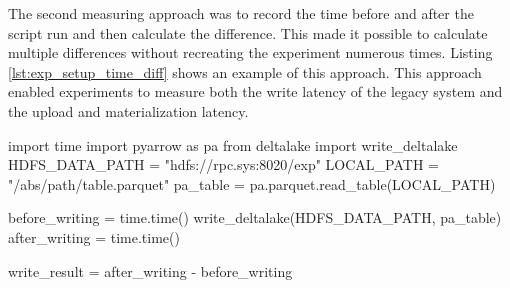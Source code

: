The second measuring approach was to record the time before and after the script run and then calculate the difference. This made it possible to calculate multiple differences without recreating the experiment numerous times. Listing \ref{lst:exp_setup_time_diff} shows an example of this approach. This approach enabled experiments to measure both the write latency of the legacy system and the upload and materialization latency.
\begin{minipage}{\textwidth}
\begin{python}[caption={[Measuring latency using the time difference]A simple time difference approach to measure the time required to write a Delta Lake table to \gls{HopsFS}.}, label={lst:exp_setup_time_diff}]
import time
import pyarrow as pa
from deltalake import write_deltalake
HDFS_DATA_PATH = "hdfs://rpc.sys:8020/exp" 
LOCAL_PATH = "/abs/path/table.parquet"
pa_table = pa.parquet.read_table(LOCAL_PATH)

before_writing = time.time()
write_deltalake(HDFS_DATA_PATH, pa_table)
after_writing = time.time()

write_result = after_writing - before_writing
\end{python}
\end{minipage}


